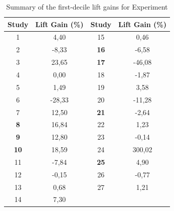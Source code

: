 \begin{table}[!ht]
\centering
\begin{adjustbox}{max width=7cm}
\begin{tabular}{|c|c|c|c|}
\hline
\textbf{Study} & \textbf{Lift Gain (\%)}        & \textbf{Study} & \textbf{Lift Gain (\%)}        \\ \hline
1              & \cellcolor[HTML]{00c901}4,40   & 15             & \cellcolor[HTML]{00c901}0,46   \\ \hline
2              & \cellcolor[HTML]{ff514d}-8,33  & \textbf{16}    & \cellcolor[HTML]{ff514d}-6,58  \\ \hline
3              & \cellcolor[HTML]{009901}23,65  & \textbf{17}    & \cellcolor[HTML]{ffce93}-46,08 \\ \hline
4              & 0,00                           & 18             & \cellcolor[HTML]{ffccc9}-1,87  \\ \hline
5              & \cellcolor[HTML]{00c901}1,49   & 19             & \cellcolor[HTML]{00c901}3,58   \\ \hline
6              & \cellcolor[HTML]{ffce93}-28,33 & 20             & \cellcolor[HTML]{ff514d}-11,28 \\ \hline
7              & \cellcolor[HTML]{009901}12,50  & \textbf{21}    & \cellcolor[HTML]{ffccc9}-2,64  \\ \hline
\textbf{8}     & \cellcolor[HTML]{009901}16,84  & 22             & \cellcolor[HTML]{00c901}1,23   \\ \hline
\textbf{9}     & \cellcolor[HTML]{009901}12,80  & 23             & \cellcolor[HTML]{ffccc9}-0,14  \\ \hline
\textbf{10}    & \cellcolor[HTML]{009901}18,59  & 24             & \cellcolor[HTML]{ffce93}300,02 \\ \hline
11             & \cellcolor[HTML]{ff514d}-7,84  & \textbf{25}    & \cellcolor[HTML]{00c901}4,90   \\ \hline
12             & \cellcolor[HTML]{ffccc9}-0,15  & 26             & \cellcolor[HTML]{ffccc9}-0,77  \\ \hline
13             & \cellcolor[HTML]{00c901}0,68   & 27             & \cellcolor[HTML]{00c901}1,21   \\ \hline
14             & \cellcolor[HTML]{009901}7,30   &                &                                \\ \hline
\end{tabular}
\end{adjustbox}
\caption{Summary of the first-decile lift gains for Experiment \nameExperimentII}
\label{table:lift_gain_exp-ii}
\end{table}


